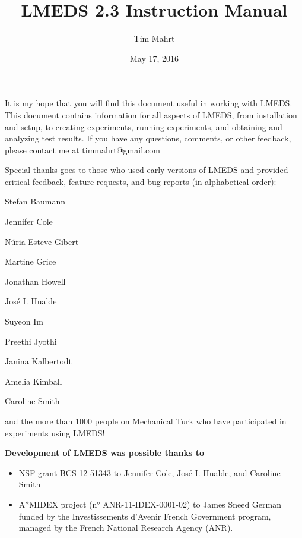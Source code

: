 \documentclass[12pt, oneside]{scrbook}   	%
\title{LMEDS 2.3 Instruction Manual}
\author{Tim Mahrt}
\date{May 17, 2016}
\begin{document}
\maketitle

\newpage

\paragraph{}

It is my hope that you will find this document useful in working with LMEDS. This document contains information for all aspects of LMEDS, from installation and setup, to creating experiments, running experiments, and obtaining and analyzing test results.  If you have any questions, comments, or other feedback, please contact me at timmahrt@gmail.com

\vspace{25mm}

Special thanks goes to those who used early versions of LMEDS and provided critical feedback, feature requests, and bug reports (in alphabetical order):

\vspace{5mm}

Stefan Baumann

Jennifer Cole

Núria Esteve Gibert

Martine Grice

Jonathan Howell

José I. Hualde

Suyeon Im

Preethi Jyothi

Janina Kalbertodt

Amelia Kimball

Caroline Smith

\vspace{5mm}

and the more than 1000 people on Mechanical Turk who have participated in experiments using LMEDS!

\vfill

\begin{tcolorbox}[breakable,colback=white,colframe=green,width=\dimexpr\textwidth+12mm\relax,enlarge left by=-6mm]

\textbf{Development of LMEDS was possible thanks to }
\begin{itemize}
\item NSF grant BCS 12-51343 to
Jennifer Cole, José I. Hualde, and Caroline Smith
\item A*MIDEX project
(n° ANR-11-IDEX-0001-02) to James Sneed German funded by the
Investissements d'Avenir French Government program,
managed by the French National Research Agency (ANR).
\end{itemize}

\end{tcolorbox}

\tableofcontents

\newpage







\end{document}
